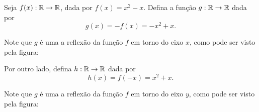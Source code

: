  \begin{exem}
  Seja $f(x): \mathbb{R} \to \mathbb{R}$, dada por $f(x)= x^2-x$. Defina a função $g: \mathbb{R} \to \mathbb{R}$ dada por
  \begin{equation*}
      g(x)=-f(x)= -x^2+x.
  \end{equation*}
  
  Note que $g$ é uma a reflexão da função $f$ em torno do eixo $x$, como pode ser visto pela figura:

    \begin{center}
\end{center}

Por outro lado, defina $h: \mathbb{R} \to \mathbb{R}$ dada por
  \begin{equation*}
      h(x)=f(-x)= x^2+x.
  \end{equation*}
  
  Note que $g$ é uma a reflexão da função $f$ em torno do eixo $y$, como pode ser visto pela figura:

    \begin{center}
\end{center}

 \end{exem}


